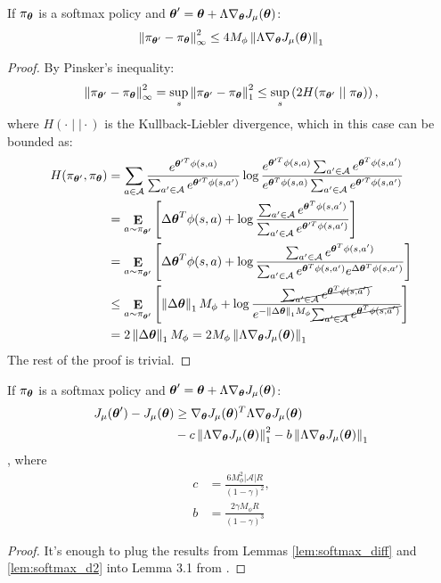 \begin{lemma}\label{lem:softmax_infnorm}
If $\pi_{\vtheta}$ is a softmax policy and $\vtheta' = \vtheta+\Lambda\gradJ{\vtheta}$:
\[
	\norm[\infty]{\pi_{\vtheta'} - \pi_{\vtheta}}^2 \leq 4M_\phi\norm[1]{\Lambda\gradJ{\vtheta}}
\]
\end{lemma}
\begin{proof}
By Pinsker's inequality:
\begin{align*}
\norm[\infty]{\pi_{\vtheta'} - \pi_{\vtheta}}^2 = \sup_s\norm[1]{\pi_{\vtheta'} - \pi_{\vtheta}}^2 \leq \sup_s\left(2H(\pi_{\vtheta'}\mid\mid\pi_{\vtheta})\right),
\end{align*}
where $H(\cdot\mid\mid\cdot)$ is the Kullback-Liebler divergence, which in this case can be bounded as:
\begin{align*}
H(\pi_{\vtheta'},\pi_{\vtheta}) &= 
\sum_{a \in \mathcal{A}}
	\frac{e^{\vtheta'^T\phi(s,a)}}{\sum_{a'\in\mathcal{A}}e^{\vtheta'^T\phi(s,a')}}
	\log\frac{e^{\vtheta'^T\phi(s,a)}\sum_{a'\in\mathcal{A}}e^{\vtheta^T\phi(s,a')}}
	{e^{\vtheta^T\phi(s,a)}\sum_{a'\in\mathcal{A}}e^{\vtheta'^T\phi(s,a')}} \\
	&= \expected{a}{\pi_{\vtheta'}}{
	\Delta\vtheta^T\phi(s,a) + \log\frac{\sum_{a'\in\mathcal{A}}e^{\vtheta^T\phi(s,a')}}
	{\sum_{a'\in\mathcal{A}}e^{\vtheta'^T\phi(s,a')}}} \\
	&= \expected{a}{\pi_{\vtheta'}}{
	\Delta\vtheta^T\phi(s,a) + \log\frac{\sum_{a'\in\mathcal{A}}e^{\vtheta^T\phi(s,a')}}		{\sum_{a'\in\mathcal{A}}e^{\vtheta^T\phi(s,a')}e^{\Delta\vtheta^T\phi(s,a')}}} \\
	&\leq \expected{a}{\pi_{\vtheta'}}{
	\norm[1]{\Delta\vtheta}M_\phi + \log\frac{\cancel{\sum_{a'\in\mathcal{A}}e^{\vtheta^T\phi(s,a')}}}
	{e^{-\norm[1]{\Delta\vtheta}M_\phi}\cancel{\sum_{a'\in\mathcal{A}}e^{\vtheta^T\phi(s,a')}}}} \\
	&= 2\norm[1]{\Delta\vtheta}M_\phi = 2M_\phi\norm[1]{\Lambda\gradJ{\vtheta}} 	
\end{align*}
The rest of the proof is trivial.
\end{proof}

\begin{theorem}\label{theo:softmax1}
If $\pi_{\vtheta}$ is a softmax policy and $\vtheta' = \vtheta+\Lambda\gradJ{\vtheta}$:
\begin{align*}
\DeltaJ &\geq \gradJ{\vtheta}^T\Lambda\gradJ{\vtheta} \\
	&-c\norm[1]{\Lambda\gradJ{\vtheta}}^2 -
	b\norm[1]{\Lambda\gradJ{\vtheta}}
\end{align*},
where
\begin{align*}
c &= \frac{6M_{\phi}^2|\mathcal{A}|R}{(1-\gamma)^2}, \\
b &=  \frac{2\gamma M_{\phi}R}{(1-\gamma)^3}
\end{align*}
\end{theorem}
\begin{proof}
It's enough to plug the results from Lemmas \ref{lem:softmax_diff} and \ref{lem:softmax_d2} into Lemma 3.1 from \cite{Pirotta2013adaptive}.
\end{proof}

